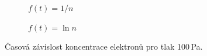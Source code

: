 \documentclass[a4paper,12pt]{article}
\begin{document}
\begin{figure}[h]
	\centering
	\begin{subfigure}[b]{.49\linewidth}
		\centering
		\caption{$f(t) = 1/n$}
	\end{subfigure}
	\begin{subfigure}[b]{.49\linewidth}
		\centering
		\caption{$f(t) = \ln n$}
	\end{subfigure}
	\caption{Časová závislost koncentrace elektronů pro tlak 100\,Pa.}
	\label{g:100Pa}
\end{figure}
\end{document}
